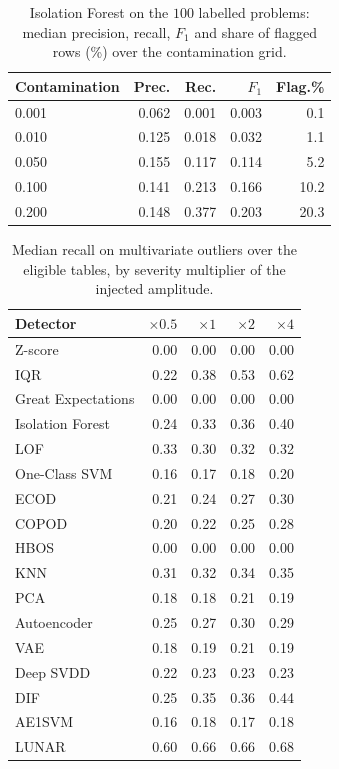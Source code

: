 \documentclass[conference]{IEEEtran}
\begin{document}
\begin{table}[t]
\caption{Isolation Forest on the $100$ labelled problems: median precision, recall, $F_1$ and share of flagged rows (\%) over the contamination grid.}
\label{tab:pool-sweep}
\centering
\footnotesize
\setlength{\tabcolsep}{4pt}
\begin{tabular}{lrrrr}
\toprule
Contamination & Prec. & Rec. & $F_1$ & Flag.\% \\
\midrule
0.001 & 0.062 & 0.001 & 0.003 & 0.1 \\
0.010 & 0.125 & 0.018 & 0.032 & 1.1 \\
0.050 & 0.155 & 0.117 & 0.114 & 5.2 \\
0.100 & 0.141 & 0.213 & 0.166 & 10.2 \\
0.200 & 0.148 & 0.377 & 0.203 & 20.3 \\
\bottomrule
\end{tabular}
\end{table}

\begin{table}[t]
\caption{Median recall on multivariate outliers over the eligible tables, by severity multiplier of the injected amplitude.}
\label{tab:pool-severity}
\centering
\footnotesize
\setlength{\tabcolsep}{4pt}
\begin{tabular}{lrrrr}
\toprule
Detector & $\times 0.5$ & $\times 1$ & $\times 2$ & $\times 4$ \\
\midrule
Z-score            & 0.00 & 0.00 & 0.00 & 0.00 \\
IQR                & 0.22 & 0.38 & 0.53 & 0.62 \\
Great Expectations & 0.00 & 0.00 & 0.00 & 0.00 \\
Isolation Forest   & 0.24 & 0.33 & 0.36 & 0.40 \\
LOF                & 0.33 & 0.30 & 0.32 & 0.32 \\
One-Class SVM      & 0.16 & 0.17 & 0.18 & 0.20 \\
ECOD               & 0.21 & 0.24 & 0.27 & 0.30 \\
COPOD              & 0.20 & 0.22 & 0.25 & 0.28 \\
HBOS               & 0.00 & 0.00 & 0.00 & 0.00 \\
KNN                & 0.31 & 0.32 & 0.34 & 0.35 \\
PCA                & 0.18 & 0.18 & 0.21 & 0.19 \\
Autoencoder        & 0.25 & 0.27 & 0.30 & 0.29 \\
VAE                & 0.18 & 0.19 & 0.21 & 0.19 \\
Deep SVDD          & 0.22 & 0.23 & 0.23 & 0.23 \\
DIF                & 0.25 & 0.35 & 0.36 & 0.44 \\
AE1SVM             & 0.16 & 0.18 & 0.17 & 0.18 \\
LUNAR              & 0.60 & 0.66 & 0.66 & 0.68 \\
\bottomrule
\end{tabular}
\end{table}
\end{document}
